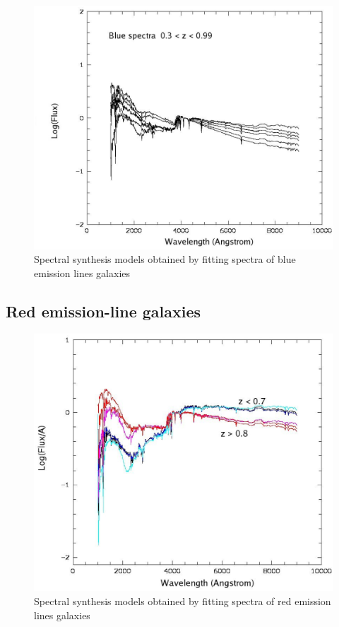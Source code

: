 \documentclass[referee]{aa}
\begin{document}

\begin{figure}
  \centering
  \vspace{-0.0cm}
  \includegraphics[width=14cm]{figures/Em-blue.eps}
 \vspace{0.0cm}
    \caption{Spectral synthesis models obtained by fitting spectra of blue emission lines galaxies}
     \label{Emblue-jpg}
\end{figure}



\subsection{Red emission-line galaxies}
\label{tracks} 


\begin{figure}
  \centering
  \vspace{0.0cm}
  \includegraphics[width=14cm]{figures/Em-red.eps}
 \vspace{0.0cm}
    \caption{Spectral synthesis models obtained by fitting spectra of red emission lines galaxies}
     \label{Emred-jpg}
\end{figure}
\end{document}
